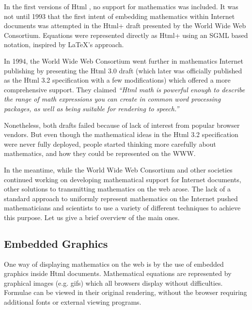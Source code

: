 In the first versions of Html , no support for mathematics was included. It was not until 1993 that the first
intent of embedding mathematics within Internet documents was attempted in the Html+ draft \cite{htmlp}
presented by the World Wide Web Consortium. Equations were represented directly as
Html+ using an SGML \cite{sgml} based notation, inspired by \LaTeX's\index{\LaTeX} approach.

In 1994, the World Wide Web Consortium went further in mathematics Internet publishing by
presenting the Html 3.0 draft \cite{html3} (which later was officially published as the Html
3.2 \cite{html3.2} specification with a few modifications) which offered a more comprehensive support.
They claimed {\it ``Html math is powerful enough to describe the range of math expressions you can create in common word
processing packages, as well as being suitable for rendering to speech.''}

Nonetheless, both drafts failed because of lack of interest from popular browser vendors. But even though the mathematical
ideas in the Html 3.2 specification were never fully deployed, people started thinking more carefully
about mathematics, and how they could be represented on the WWW.

In the meantime, while the World Wide Web Consortium and other societies continued
working on developing mathematical support for Internet documents, other solutions to transmitting mathematics on the web
arose. The lack of a standard approach to uniformly represent mathematics on the Internet pushed mathematicians and
scientists to use a variety of different techniques to achieve this purpose. Let us give a brief overview of the main
ones.
	
\subsection{Embedded Graphics}

One way of displaying mathematics on the web is by the use of embedded graphics inside Html documents. Mathematical
equations are represented by graphical images (e.g. gifs) which all browsers display without difficulties. Formulae can be
viewed in their original rendering, without the browser requiring additional fonts or external viewing programs.

